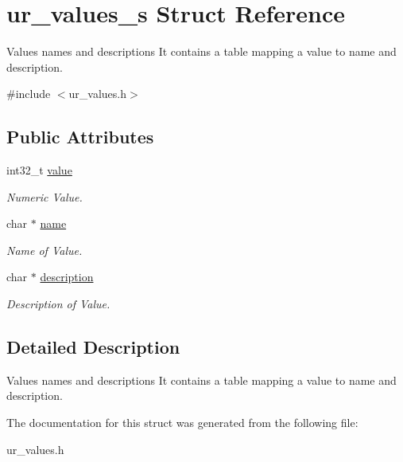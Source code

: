 \hypertarget{structur__values__s}{}\section{ur\+\_\+values\+\_\+s Struct Reference}
\label{structur__values__s}


Values names and descriptions It contains a table mapping a value to name and description.  




{\ttfamily \#include $<$ur\+\_\+values.\+h$>$}

\subsection*{Public Attributes}
\begin{DoxyCompactItemize}
\item 
int32\+\_\+t \hyperlink{structur__values__s_a7a4fbe009584c4a28cb60ded565a5b54}{value}\hypertarget{structur__values__s_a7a4fbe009584c4a28cb60ded565a5b54}{}\label{structur__values__s_a7a4fbe009584c4a28cb60ded565a5b54}

\begin{DoxyCompactList}\small\item\em Numeric Value. \end{DoxyCompactList}\item 
char $\ast$ \hyperlink{structur__values__s_a343974000c5e2b4d16d2b3c450253e25}{name}\hypertarget{structur__values__s_a343974000c5e2b4d16d2b3c450253e25}{}\label{structur__values__s_a343974000c5e2b4d16d2b3c450253e25}

\begin{DoxyCompactList}\small\item\em Name of Value. \end{DoxyCompactList}\item 
char $\ast$ \hyperlink{structur__values__s_affe372bf7c45c9524c53886ea1a58cd6}{description}\hypertarget{structur__values__s_affe372bf7c45c9524c53886ea1a58cd6}{}\label{structur__values__s_affe372bf7c45c9524c53886ea1a58cd6}

\begin{DoxyCompactList}\small\item\em Description of Value. \end{DoxyCompactList}\end{DoxyCompactItemize}


\subsection{Detailed Description}
Values names and descriptions It contains a table mapping a value to name and description. 

The documentation for this struct was generated from the following file\+:\begin{DoxyCompactItemize}
\item 
ur\+\_\+values.\+h\end{DoxyCompactItemize}
